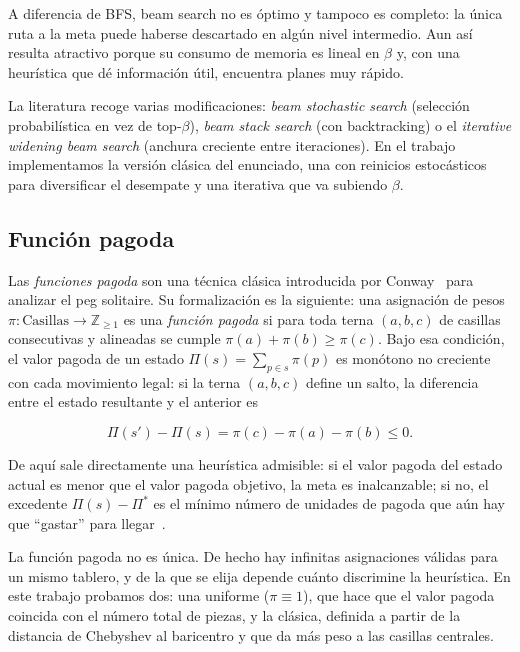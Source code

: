 \documentclass[conference,a4paper]{IEEEtran}
\begin{document}
A diferencia de BFS, beam search no es óptimo y tampoco es completo: la
única ruta a la meta puede haberse descartado en algún nivel intermedio.
Aun así resulta atractivo porque su consumo de memoria es lineal en
$\beta$ y, con una heurística que dé información útil, encuentra planes
muy rápido.

La literatura recoge varias modificaciones: \emph{beam stochastic search}
(selección probabilística en vez de top-$\beta$), \emph{beam stack search}
(con backtracking) o el \emph{iterative widening beam search} (anchura
creciente entre iteraciones). En el trabajo implementamos la versión
clásica del enunciado, una con reinicios estocásticos para diversificar el
desempate y una iterativa que va subiendo $\beta$.


\subsection{Función pagoda}

Las \emph{funciones pagoda} son una técnica clásica introducida por
Conway~\cite{senku-counts} para analizar el peg solitaire. Su formalización
es la siguiente: una asignación de pesos
$\pi:\text{Casillas}\to\mathbb{Z}_{\geq 1}$ es una \emph{función pagoda} si
para toda terna $(a,b,c)$ de casillas consecutivas y alineadas se cumple
$\pi(a) + \pi(b) \geq \pi(c)$. Bajo esa condición, el valor pagoda de un
estado $\Pi(s) = \sum_{p\in s} \pi(p)$ es monótono no creciente con cada
movimiento legal: si la terna $(a,b,c)$ define un salto, la
diferencia entre el estado resultante y el anterior es

\begin{equation}
\label{eq:pagoda-delta}
\Pi(s') - \Pi(s) = \pi(c) - \pi(a) - \pi(b) \leq 0.
\end{equation}

De aquí sale directamente una heurística admisible: si el valor pagoda
del estado actual es menor que el valor pagoda objetivo, la meta es
inalcanzable; si no, el excedente $\Pi(s) - \Pi^{*}$ es el mínimo número
de unidades de pagoda que aún hay que ``gastar'' para
llegar~\cite{senku-counts}.

La función pagoda no es única. De hecho hay infinitas asignaciones
válidas para un mismo tablero, y de la que se elija depende cuánto
discrimine la heurística. En este trabajo probamos dos: una uniforme
($\pi\equiv 1$), que hace que el valor pagoda coincida con el número
total de piezas, y la clásica, definida a partir de la distancia de
Chebyshev al baricentro y que da más peso a las casillas centrales.
\end{document}
